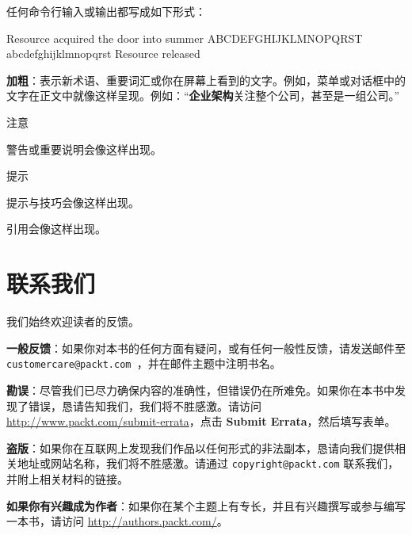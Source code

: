 任何命令行输入或输出都写成如下形式：

\begin{codebox}[text]
Resource acquired
the door into summer
ABCDEFGHIJKLMNOPQRST
abcdefghijklmnopqrst
Resource released
\end{codebox}

\textbf{加粗}：表示新术语、重要词汇或你在屏幕上看到的文字。例如，菜单或对话框中的文字在正文中就像这样呈现。例如：“\textbf{企业架构}关注整个公司，甚至是一组公司。”

\begin{myNotic}{注意}

警告或重要说明会像这样出现。
\end{myNotic}

\begin{myTip}{提示}

提示与技巧会像这样出现。
\end{myTip}

\begin{myQuote}
引用会像这样出现。

\end{myQuote}

\section*{联系我们}

我们始终欢迎读者的反馈。

\textbf{一般反馈}：如果你对本书的任何方面有疑问，或有任何一般性反馈，请发送邮件至 \texttt{customercare@packt.\allowbreak{}com }，并在邮件主题中注明书名。

\textbf{勘误}：尽管我们已尽力确保内容的准确性，但错误仍在所难免。如果你在本书中发现了错误，恳请告知我们，我们将不胜感激。请访问 \href{http://www.packt.com/submit-errata}{http://www.packt.com/submit-errata}，点击 \textbf{Submit Errata}，然后填写表单。

\textbf{盗版}：如果你在互联网上发现我们作品以任何形式的非法副本，恳请向我们提供相关地址或网站名称，我们将不胜感激。请通过 \texttt{copyright@packt.\allowbreak{}com} 联系我们，并附上相关材料的链接。

\textbf{如果你有兴趣成为作者}：如果你在某个主题上有专长，并且有兴趣撰写或参与编写一本书，请访问 \href{http://authors.packt.com/}{http://authors.packt.com/}。
